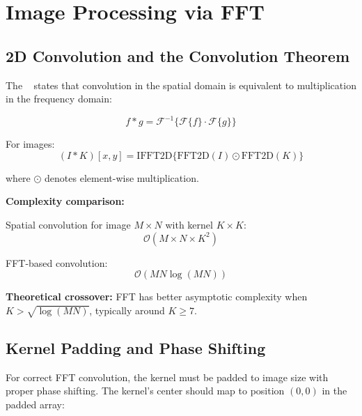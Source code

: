 \section{Image Processing via FFT}\label{sec:image}

\subsection{2D Convolution and the Convolution
Theorem}\label{subsec:convolution_theorem}

The ~\cite{blozinski1972convolution} states
that convolution in the spatial domain is equivalent to
multiplication in the frequency domain:

\begin{equation}
  \label{eq:convolution_theorem}
  f \ast g = \mathcal{F}^{-1}\{\mathcal{F}\{f\} \cdot \mathcal{F}\{g\}\}
\end{equation}

For images:
\begin{equation}
  (I \ast K)[x, y] = \text{IFFT2D}\{\text{FFT2D}(I) \odot \text{FFT2D}(K)\}
\end{equation}

where $\odot$ denotes element-wise multiplication.

\textbf{Complexity comparison:}

Spatial convolution for image $M \times N$ with kernel $K \times K$:
\begin{equation}
  \mathcal{O}(M \times N \times K^2)
\end{equation}

FFT-based convolution:
\begin{equation}
  \mathcal{O}(M N \log(MN))
\end{equation}

\textbf{Theoretical crossover:} FFT has better asymptotic complexity when $K >
\sqrt{\log(MN)}$, typically around $K \geq 7$.

\subsection{Kernel Padding and Phase Shifting}

For correct FFT convolution, the kernel must be padded to image size
with proper phase shifting. The kernel's center should map to
position $(0, 0)$ in the padded array:


